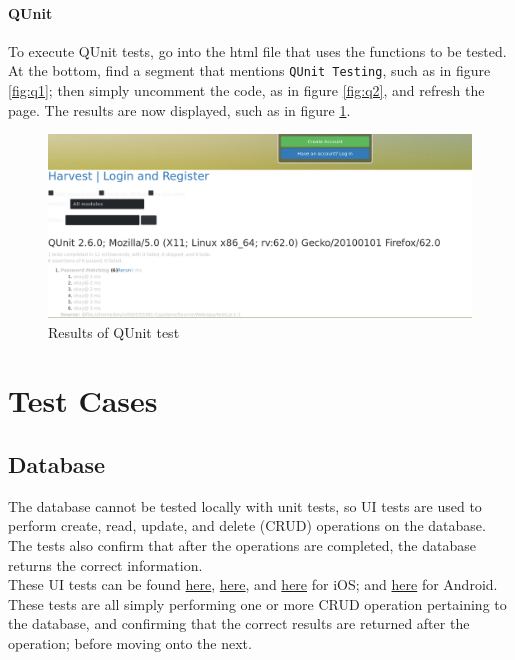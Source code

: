 \documentclass[12pt]{article}
\begin{document}
\paragraph{QUnit} To execute QUnit tests, go into the html file that uses the functions to be tested. At the bottom, find a segment that mentions \texttt{QUnit Testing}, such as in figure \ref{fig:q1}; then simply uncomment the code, as in figure \ref{fig:q2}, and refresh the page. The results are now displayed, such as in figure \ref{fig:qr}.

\begin{figure}
\includegraphics[width=\textwidth]{images/qr.png}
\caption{Results of QUnit test}
\label{fig:qr}
\end{figure}

\section{Test Cases}
\subsection{Database}
The database cannot be tested locally with unit tests, so UI tests are used to perform create, read, update, and delete (CRUD) operations on the database. The tests also confirm that after the operations are completed, the database returns the correct information.\\
\indent These UI tests can be found \href{https://github.com/BinaryNinjaz/COS301-Capstone/blob/master/Source/iOS/Harvest/HarvestUITests/HarvestEntityCreationUITests.swift}{here}, \href{https://github.com/BinaryNinjaz/COS301-Capstone/blob/master/Source/iOS/Harvest/HarvestTests/HarvestTests.swift}{here}, and \href{https://github.com/BinaryNinjaz/COS301-Capstone/blob/master/Source/iOS/Harvest/HarvestUITests/HarvestEntityDeletionUITests.swift}{here} for iOS; and \href{https://github.com/BinaryNinjaz/COS301-Capstone/blob/master/Source/Android/Harvest/app/src/androidTest/java/za/org/samac/harvest/InformationTest.java}{here} for Android. These tests are all simply performing one or more CRUD operation pertaining to the database, and confirming that the correct results are returned after the operation; before moving onto the next.
\end{document}
